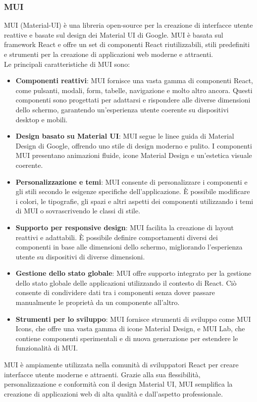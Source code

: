 \subsubsection{MUI}
MUI (Material-UI) è una libreria open-source per la creazione di interfacce utente reattive e basate sul design dei Material UI di Google. MUI è basata sul framework React e offre un set di componenti React riutilizzabili, stili predefiniti e strumenti per la creazione di applicazioni web moderne e attraenti.\\
Le principali caratteristiche di MUI sono:
\begin{itemize}
    \item \textbf{Componenti reattivi}: MUI fornisce una vasta gamma di componenti React, come pulsanti, modali, form, tabelle, navigazione e molto altro ancora. Questi componenti sono progettati per adattarsi e rispondere alle diverse dimensioni dello schermo, garantendo un'esperienza utente coerente su dispositivi desktop e mobili.
    \item \textbf{Design basato su Material UI}: MUI segue le linee guida di Material Design di Google, offrendo uno stile di design moderno e pulito. I componenti MUI presentano animazioni fluide, icone Material Design e un'estetica visuale coerente.
    \item \textbf{Personalizzazione e temi}: MUI consente di personalizzare i componenti e gli stili secondo le esigenze specifiche dell'applicazione. È possibile modificare i colori, le tipografie, gli spazi e altri aspetti dei componenti utilizzando i temi di MUI o sovrascrivendo le classi di stile.
    \item \textbf{Supporto per responsive design}: MUI facilita la creazione di layout reattivi e adattabili. È possibile definire comportamenti diversi dei componenti in base alle dimensioni dello schermo, migliorando l'esperienza utente su dispositivi di diverse dimensioni.
    \item \textbf{Gestione dello stato globale}: MUI offre supporto integrato per la gestione dello stato globale delle applicazioni utilizzando il contesto di React. Ciò consente di condividere dati tra i componenti senza dover passare manualmente le proprietà da un componente all'altro.
    \item \textbf{Strumenti per lo sviluppo}: MUI fornisce strumenti di sviluppo come MUI Icons, che offre una vasta gamma di icone Material Design, e MUI Lab, che contiene componenti sperimentali e di nuova generazione per estendere le funzionalità di MUI.
    \end{itemize}
    MUI è ampiamente utilizzata nella comunità di sviluppatori React per creare interfacce utente moderne e attraenti. Grazie alla sua flessibilità, personalizzazione e conformità con il design Material UI, MUI semplifica la creazione di applicazioni web di alta qualità e dall'aspetto professionale.

